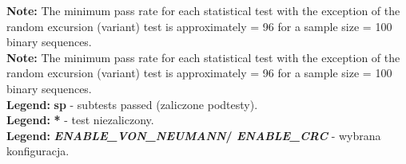 \begin{flushleft}
\small \textbf{Note:} The minimum pass rate for each statistical test with the exception of the
random excursion (variant) test is approximately = 96 for a
sample size = 100 binary sequences\cite{NIST-SP-800-22}. \\
\small \textbf{Note:} The minimum pass rate for each statistical test with the exception of the
random excursion (variant) test is approximately = 96 for a
sample size = 100 binary sequences\cite{NIST-SP-800-22}. \\
\small \textbf{Legend:} \textbf{sp} - subtests passed (zaliczone podtesty). \\
\small \textbf{Legend:} \textbf{*} - test niezaliczony. \\
\small \textbf{Legend:} \textbf{\textit{ENABLE\_VON\_NEUMANN}/ \textit{ENABLE\_CRC}} - wybrana konfiguracja.
\end{flushleft}

